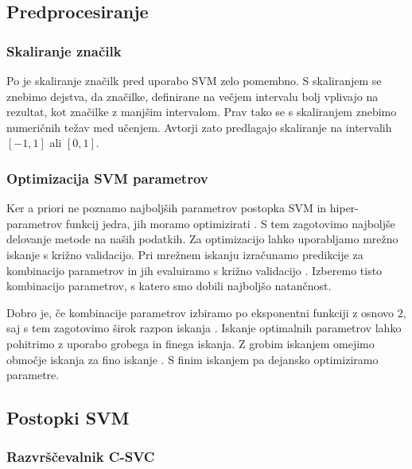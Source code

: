 {\subsection{Predprocesiranje}
\subsubsection{Skaliranje značilk}

Po \cite{hsu2003practical} je skaliranje značilk pred uporabo SVM zelo pomembno. S skaliranjem se znebimo dejstva, da značilke, definirane na večjem intervalu bolj vplivajo na rezultat, kot značilke z manjšim intervalom. Prav tako se s skaliranjem znebimo numeričnih težav med učenjem. Avtorji \cite{hsu2003practical} zato predlagajo skaliranje na intervalih $[-1, 1]$ ali $[0, 1]$.







\subsubsection{Optimizacija SVM parametrov}\label{sec:optimizacija-svm-parametrov}

Ker a priori ne poznamo najboljših parametrov postopka SVM in hiper-parametrov funkcij jedra, jih moramo optimizirati \cite{hsu2003practical}. S tem zagotovimo najboljše delovanje metode na naših podatkih. Za optimizacijo lahko uporabljamo mrežno iskanje s križno validacijo.  Pri mrežnem iskanju izračunamo predikcije za kombinacijo parametrov in jih evaluiramo s križno validacijo \cite{hsu2003practical}. Izberemo tisto kombinacijo parametrov, s katero smo dobili najboljšo natančnost. 

Dobro je, če kombinacije parametrov izbiramo po eksponentni funkciji z osnovo $2$, saj s tem zagotovimo širok razpon iskanja \cite{hsu2003practical}. Iskanje optimalnih parametrov lahko pohitrimo z uporabo grobega in finega iskanja. Z grobim iskanjem omejimo območje iskanja za fino iskanje \cite{hsu2003practical}. S finim iskanjem pa dejansko optimiziramo parametre.






\subsection{Postopki SVM}
\subsubsection{Razvrščevalnik C-SVC}

}
